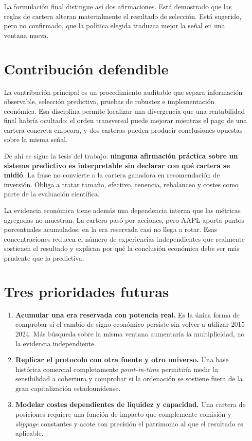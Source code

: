 La formulación final distingue así dos afirmaciones. Está demostrado que las reglas de cartera
alteran materialmente el resultado de selección. Está sugerido, pero no confirmado, que la política
elegida traduzca mejor la señal en una ventana nueva.

\section{Contribución defendible}

La contribución principal es un procedimiento auditable que separa información observable,
selección predictiva, pruebas de robustez e implementación económica. Esa disciplina permite
localizar una divergencia que una rentabilidad final habría ocultado: el orden transversal puede
mejorar mientras el pago de una cartera concreta empeora, y dos carteras pueden producir
conclusiones opuestas sobre la misma señal.

De ahí se sigue la tesis del trabajo: \textbf{ninguna afirmación práctica sobre un sistema
predictivo es interpretable sin declarar con qué cartera se midió}. La frase no convierte a la
cartera ganadora en recomendación de inversión. Obliga a tratar tamaño, efectivo, tenencia,
rebalanceo y costes como parte de la evaluación científica.

La evidencia económica tiene además una dependencia interna que las métricas agregadas no muestran.
La cartera pasó por \NumAccionesCartera{} acciones, pero AAPL aporta \ContribucionAAPL{} puntos
porcentuales acumulados; en la era reservada casi no llega a rotar. Esas concentraciones reducen el
número de experiencias independientes que realmente sostienen el resultado y explican por qué la
conclusión económica debe ser más prudente que la predictiva.

\section{Tres prioridades futuras}

\begin{enumerate}[leftmargin=*,itemsep=0.5em]
  \item \textbf{Acumular una era reservada con potencia real.} Es la única forma de comprobar si el
  cambio de signo económico persiste sin volver a utilizar 2015--2024. Más búsqueda sobre la misma
  ventana aumentaría la multiplicidad, no la evidencia independiente.
  \item \textbf{Replicar el protocolo con otra fuente y otro universo.} Una base histórica comercial
  completamente \textit{point-in-time} permitiría medir la sensibilidad a cobertura y comprobar si
  la ordenación se sostiene fuera de la gran capitalización estadounidense.
  \item \textbf{Modelar costes dependientes de liquidez y capacidad.} Una cartera de
  \PosicionesCartera{} posiciones requiere una función de impacto que complemente comisión y
  \textit{slippage} constantes y acote con precisión el patrimonio al que el resultado es aplicable.
\end{enumerate}


